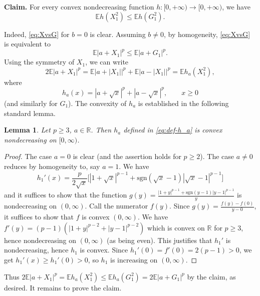 \documentclass[10pt]{article}
\newcommand{\E}{\mathbb{E}}
\newcommand{\1}{\textbf{1}}
\newcommand{\R}{\mathbb{R}}
\newtheorem{lemma}[theorem]{Lemma}
\theoremstyle{remark}
\theoremstyle{definition}
\begin{document}
\bigskip
\noindent\textbf{Claim.} For every convex nondecreasing function $h\colon [0,+\infty)\to [0,+\infty)$, we have 
\begin{equation}\label{eq:X^2vsG^2}
\E h(X_1^2) \leq \E h(G_1^2).
\end{equation}

\noindent
Indeed, \eqref{eq:XvsG} for $b = 0$ is clear. Assuming $b \neq 0$, by homogeneity, \eqref{eq:XvsG} is equivalent to
\[
\E|a+X_1|^p \leq \E|a+G_1|^p.
\]
Using the symmetry of $X_1$, we can write
\[
2\E|a+X_1|^p = \E|a + |X_1||^p + \E|a-|X_1||^p = \E h_a(X_1^2),
\]
where
\begin{equation}\label{eq:def-h_a}
h_a(x) = |a + \sqrt{x}|^p + |a - \sqrt{x}|^p, \qquad x \geq 0
\end{equation}
(and similarly for $G_1$). The convexity of $h_a$ is established in the following standard lemma.

\begin{lemma}\label{lm:h_a-convex}
Let $p \geq 3$, $a \in \R$. Then $h_a$ defined in \eqref{eq:def-h_a} is convex nondecreasing on $[0,\infty)$.
\end{lemma}
\begin{proof}
The case $a = 0$ is clear (and the assertion holds for $p \geq 2$). The case $a \neq 0$ reduces by homogeneity to, say $a = 1$. We have
\[
h_1'(x) = \frac{p}{2\sqrt{x}}\Big[|1+\sqrt{x}|^{p-1}+\text{sgn}(\sqrt{x}-1)|\sqrt{x}-1|^{p-1}\Big]
\]
and it suffices to show that the function $g(y) = \frac{|1+y|^{p-1}+\text{sgn}(y-1)|y-1|^{p-1}}{y}$ is nondecreasing on $(0,\infty)$. Call the numerator $f(y)$. Since $g(y) = \frac{f(y) - f(0)}{y-0}$, it suffices to show that $f$ is convex $(0,\infty)$. We have $f'(y) = (p-1)(|1+y|^{p-2}+|y-1|^{p-2})$ which is convex on $\R$ for $p \geq 3$, hence nondecreasing on $(0,\infty)$ (as being even). This justifies that $h_1'$ is nondecreasing, hence $h_1$ is convex. Since $h_1'(0) = f'(0) = 2(p-1) > 0$, we get $h_1'(x) \geq h_1'(0) > 0$, so $h_1$ is increasing on $(0,\infty)$.
\end{proof}

Thus $2\E|a+X_1|^p = \E h_a(X_1^2) \leq \E h_a(G_1^2) = 2\E|a+G_1|^p$ by the claim, as desired. It remains to prove the claim.
\end{document}
